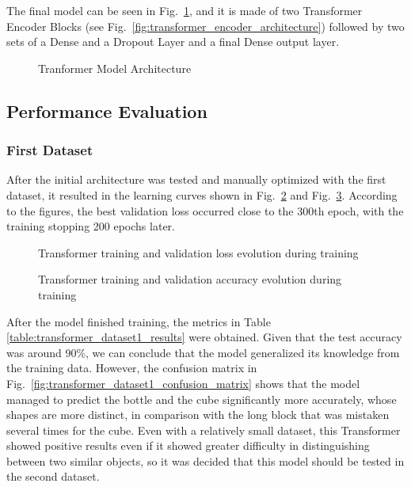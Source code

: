 The final model can be seen in Fig.~\ref{fig:transformer_architecture}, and it is made of two Transformer Encoder Blocks (see Fig.~\ref{fig:transformer_encoder_architecture}) followed by two sets of a Dense and a Dropout Layer and a final Dense output layer.

\begin{figure}[H]
    \centering
    {\fontsize{10}{12}\selectfont}
    \caption[Tranformer Model Architecture]{Tranformer Model Architecture}
    \label{fig:transformer_architecture}
\end{figure}

\subsection{Performance Evaluation}

\subsubsection{First Dataset}

After the initial architecture was tested and manually optimized with the first dataset, it resulted in the learning curves shown in Fig.~\ref{fig:transformer_dataset1_loss} and Fig.~\ref{fig:transformer_dataset1_acc}. According to the figures, the best validation loss occurred close to the 300th epoch, with the training stopping 200 epochs later.

\begin{figure}[H]
    \centering
    {\fontsize{10}{12}\selectfont}
    \caption[Transformer training and validation loss evolution during training]{Transformer training and validation loss evolution during training}
    \label{fig:transformer_dataset1_loss}
\end{figure}

\begin{figure}[H]
    \centering
    {\fontsize{10}{12}\selectfont}
    \caption[Transformer training and validation accuracy evolution during training]{Transformer training and validation accuracy evolution during training}
    \label{fig:transformer_dataset1_acc}
\end{figure}

After the model finished training, the metrics in Table \ref{table:transformer_dataset1_results} were obtained. Given that the test accuracy was around 90\%, we can conclude that the model generalized its knowledge from the training data. However, the confusion matrix in Fig.~\ref{fig:transformer_dataset1_confusion_matrix} shows that the model managed to predict the bottle and the cube significantly more accurately, whose shapes are more distinct, in comparison with the long block that was mistaken several times for the cube. Even with a relatively small dataset, this Transformer showed positive results even if it showed greater difficulty in distinguishing between two similar objects, so it was decided that this model should be tested in the second dataset.

